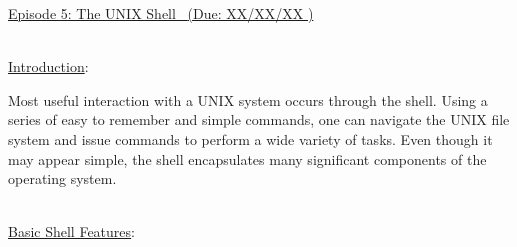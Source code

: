 \documentclass[12pt]{extarticle}
\newenvironment{myindentpar}[1]%
 {\begin{list}{}%
         {\setlength{\leftmargin}{#1}}%
         \item[]%
 }
 {\end{list}}
\newcommand{\duedate}{XX/XX/XX }
\begin{document}
\begin{center}
    \underline{{\large Episode 5: The UNIX Shell \  }(Due: \duedate)}  \\
\end{center}

\ \\
{\large \underline{Introduction}:}

\begin{myindentpar}{5mm}

Most useful interaction with a UNIX system occurs through the shell.  Using a series of easy to remember and simple commands, one can navigate the UNIX file system and issue commands to perform a wide variety of tasks.  Even though it may appear simple, the shell encapsulates many significant components of the operating system.  

\end{myindentpar}

\ \\
{\large \underline{Basic Shell Features}:}
\end{document}
